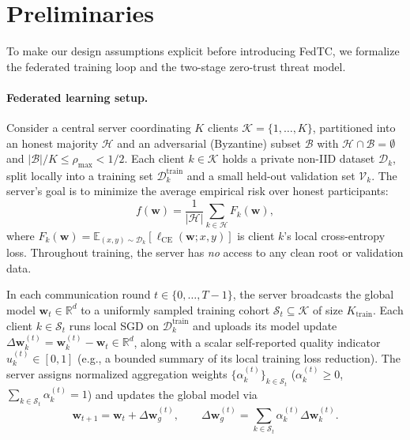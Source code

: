 \section{Preliminaries}
\label{sec:preliminaries}

To make our design assumptions explicit before introducing FedTC, we formalize the federated training loop and the two-stage zero-trust threat model.

\paragraph{Federated learning setup.}
Consider a central server coordinating $K$ clients $\mathcal{K} = \{1, \dots, K\}$, partitioned into an honest majority $\mathcal{H}$ and an adversarial (Byzantine) subset $\mathcal{B}$ with $\mathcal{H}\cap\mathcal{B} = \emptyset$ and $|\mathcal{B}|/K \le \rho_{\max} < 1/2$. Each client $k \in \mathcal{K}$ holds a private non-IID dataset $\mathcal{D}_k$, split locally into a training set $\mathcal{D}_k^{\mathrm{train}}$ and a small held-out validation set $\mathcal{V}_k$. The server's goal is to minimize the average empirical risk over honest participants:
\begin{equation}
    f(\mathbf{w}) = \frac{1}{|\mathcal{H}|} \sum_{k \in \mathcal{H}} F_k(\mathbf{w}),
\end{equation}
where $F_k(\mathbf{w}) = \mathbb{E}_{(x,y)\sim\mathcal{D}_k}[\ell_{\mathrm{CE}}(\mathbf{w}; x, y)]$ is client $k$'s local cross-entropy loss. Throughout training, the server has \emph{no} access to any clean root or validation data.

In each communication round $t \in \{0, \dots, T-1\}$, the server broadcasts the global model $\mathbf{w}_t \in \mathbb{R}^d$ to a uniformly sampled training cohort $\mathcal{S}_t \subseteq \mathcal{K}$ of size $K_{\mathrm{train}}$. Each client $k \in \mathcal{S}_t$ runs local SGD on $\mathcal{D}_k^{\mathrm{train}}$ and uploads its model update $\Delta\mathbf{w}_k^{(t)} = \mathbf{w}_k^{(t)} - \mathbf{w}_t \in \mathbb{R}^d$, along with a scalar self-reported quality indicator $u_k^{(t)} \in [0, 1]$ (e.g., a bounded summary of its local training loss reduction). The server assigns normalized aggregation weights $\{\alpha_k^{(t)}\}_{k\in\mathcal{S}_t}$ ($\alpha_k^{(t)} \ge 0$, $\sum_{k\in\mathcal{S}_t}\alpha_k^{(t)} = 1$) and updates the global model via
\begin{equation}
    \mathbf{w}_{t+1} = \mathbf{w}_t + \Delta\mathbf{w}_g^{(t)},
    \qquad
    \Delta\mathbf{w}_g^{(t)} = \sum_{k \in \mathcal{S}_t} \alpha_k^{(t)} \Delta\mathbf{w}_k^{(t)}.
\end{equation}

